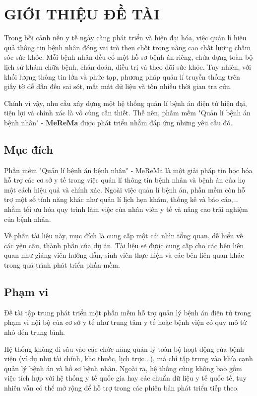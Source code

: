 \chapter{GIỚI THIỆU ĐỀ TÀI}

Trong bối cảnh nền y tế ngày càng phát triển và hiện đại hóa, việc quản lí hiệu quả thông tin bệnh nhân đóng vai trò then chốt trong nâng cao chất lượng chăm sóc sức khỏe. Mỗi bệnh nhân đều có một hồ sơ bệnh án riêng, chứa đựng toàn bộ lịch sử khám chữa bệnh, chẩn đoán, điều trị và theo dõi sức khỏe. Tuy nhiên, với khối lượng thông tin lớn và phức tạp, phương pháp quản lí truyền thống trên giấy tờ dễ dẫn đến sai sót, mất mát dữ liệu và tốn nhiều thời gian tra cứu.

Chính vì vậy, nhu cầu xây dựng một hệ thống quản lí bệnh án điện tử hiện đại, tiện lợi và chính xác là vô cùng cần thiết. Thế nên, phầm mềm "Quản lí bệnh án bệnh nhân" - \textbf{MeReMa} được phát triển nhằm đáp ứng những yêu cầu đó.

\section{Mục đích}

Phần mềm "Quản lí bệnh án bệnh nhân" - MeReMa là một giải pháp tin học hóa hỗ trợ các cơ sở y tế trong việc quản lí thông tin bệnh nhân và bệnh án của họ một cách hiệu quả và chính xác. Ngoài việc quản lí bệnh án, phần mềm còn hỗ trợ một số tính năng khác như quản lí lịch hẹn khám, thống kê và báo cáo,... nhằm tối ưu hóa quy trình làm việc của nhân viên y tế và nâng cao trải nghiệm của bệnh nhân.

Về phần tài liệu này, mục đích là cung cấp một cái nhìn tổng quan, dễ hiểu về các yêu cầu, thành phần của dự án. Tài liệu sẽ được cung cấp cho các bên liên quan như giảng viên hướng dẫn, sinh viên thực hiện và các bên liên quan khác trong quá trình phát triển phần mềm. 

\section{Phạm vi}

Đề tài tập trung phát triển một phần mềm hỗ trợ quản lý bệnh án điện tử trong phạm vi nội bộ của cơ sở y tế như trung tâm y tế hoặc bệnh viện có quy mô từ nhỏ đến trung bình.

Hệ thống không đi sâu vào các chức năng quản lý toàn bộ hoạt động của bệnh viện (ví dụ như tài chính, kho thuốc, lịch trực...), mà chỉ tập trung vào khía cạnh quản lý bệnh án và hồ sơ bệnh nhân. Ngoài ra, hệ thống cũng không bao gồm việc tích hợp với hệ thống y tế quốc gia hay các chuẩn dữ liệu y tế quốc tế, tuy nhiên vẫn có thể mở rộng để hỗ trợ trong các phiên bản phát triển tiếp theo.

